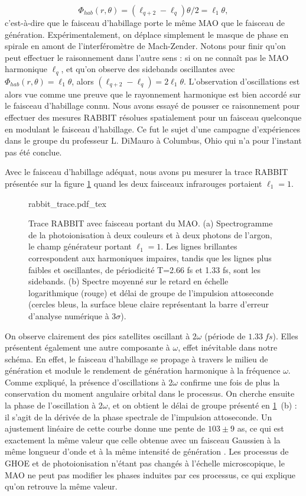 \begin{equation*}
{\Phi }_{hab}(r,\theta )=\left(\ell_{q+2}-\ell_q\right)\theta/2=\ell_1\theta,
\end{equation*}
c'est-à-dire que le faisceau d'habillage porte le même MAO que le faisceau de génération. Expérimentalement, on déplace simplement le masque de phase en spirale en amont de l'interféromètre de Mach-Zender. Notons pour finir qu'on peut effectuer le raisonnement dans l'autre sens : si on ne connaît pas le MAO harmonique $\ell_q$, et qu'on observe des sidebands oscillantes avec ${\Phi }_{hab}(r,\theta )=\ell_1\theta$, alors $\left(\ell_{q+2}-\ell_q\right)=2\ell_1\theta$. L'observation d'oscillations est alors vue comme une preuve que le rayonnement harmonique est bien accordé sur le faisceau d'habillage connu. Nous avons essayé de pousser ce raisonnement pour effectuer des mesures RABBIT résolues spatialement pour un faisceau quelconque en modulant le faisceau d'habillage. Ce fut le sujet d'une campagne d'expériences dans le groupe du professeur L. DiMauro à Columbus, Ohio qui n'a pour l'instant pas été conclue.

Avec le faisceau d'habillage adéquat, nous avons pu mesurer la trace RABBIT présentée sur la figure \ref{Fig:omabbit} quand les deux faisceaux infrarouges portaient $\ell_1=1$.

\begin{figure}[!ht]
\centering
\def\svgwidth{\columnwidth}
{rabbit_trace.pdf_tex}
\caption{Trace RABBIT avec faisceau portant du MAO. (a) Spectrogramme de la photoionisation à deux couleurs et à deux photons de l'argon, le champ générateur portant $\ell_1=1$. Les lignes brillantes correspondent aux harmoniques impaires, tandis que les lignes plus faibles et oscillantes, de périodicité T=2.66 fs et 1.33 fs, sont les sidebands. (b) Spectre moyenné sur le retard en échelle logarithmique (rouge) et délai de groupe de l'impulsion attoseconde (cercles bleus, la surface bleue claire représentant la barre d'erreur d'analyse numérique à $3\sigma$).}
\label{Fig:omabbit}
\end{figure}

On observe clairement des pics satellites oscillant à $2\omega$ (période de  $\SI{1.33}{fs}$). Elles présentent également une autre composante à $\omega$, effet inévitable dans notre schéma. En effet, le faisceau d'habillage se propage à travers le milieu de génération et module le rendement de génération harmonique à la fréquence $\omega$. Comme expliqué, la présence d'oscillations à $2\omega$ confirme une fois de plus la conservation du moment angulaire orbital dans le processus. On cherche ensuite la phase de l'oscillation à $2\omega$, et on obtient le délai de groupe présenté en \ref{Fig:omabbit}~(b) : il s'agit de la dérivée de la phase spectrale de l'impulsion attoseconde. Un ajustement linéaire de cette courbe donne une pente de $103\pm9$ as, ce qui est exactement la même valeur que celle obtenue avec un faisceau Gaussien à la même longueur d'onde et à la même intensité de génération . Les processus de GHOE et de photoionisation n'étant pas changés à l'échelle microscopique, le MAO ne peut pas modifier les phases induites par ces processus, ce qui explique qu'on retrouve la même valeur.

